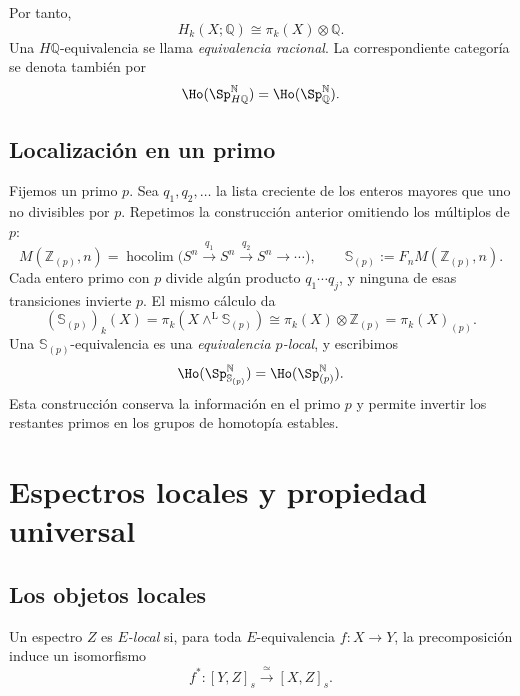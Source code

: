 Por tanto,
\[
H_k(X;\mathbb Q)\cong\pi_k(X)\otimes\mathbb Q.
\]
Una $H\mathbb Q$-equivalencia se llama \emph{equivalencia racional}. La correspondiente categoría se denota también por
\[
\Ho(\Sp_{H\mathbb Q}^{\mathbb N})=\Ho(\Sp_{\mathbb Q}^{\mathbb N}).
\]

\subsection{Localización en un primo}
Fijemos un primo $p$. Sea $q_1,q_2,\ldots$ la lista creciente de los enteros mayores que uno no divisibles por $p$. Repetimos la construcción anterior omitiendo los múltiplos de $p$:
\[
M(\mathbb Z_{(p)},n)=\operatorname*{hocolim}
\bigl(S^n\xrightarrow{q_1}S^n\xrightarrow{q_2}S^n\longrightarrow\cdots\bigr),
\qquad\mathbb S_{(p)}:=F_nM(\mathbb Z_{(p)},n).
\]
Cada entero primo con $p$ divide algún producto $q_1\cdots q_j$, y ninguna de esas transiciones invierte $p$. El mismo cálculo da
\[
(\mathbb S_{(p)})_k(X)
=\pi_k(X\wedge^{\mathrm L}\mathbb S_{(p)})
\cong\pi_k(X)\otimes\mathbb Z_{(p)}
=\pi_k(X)_{(p)}.
\]
Una $\mathbb S_{(p)}$-equivalencia es una \emph{equivalencia $p$-local}, y escribimos
\[
\Ho(\Sp_{\mathbb S_{(p)}}^{\mathbb N})=\Ho(\Sp_{(p)}^{\mathbb N}).
\]
Esta construcción conserva la información en el primo $p$ y permite invertir los restantes primos en los grupos de homotopía estables.

\section{Espectros locales y propiedad universal}

\subsection{Los objetos locales}
\begin{defi}\label{defi:c21-espectro-local}
Un espectro $Z$ es \emph{$E$-local} si, para toda $E$-equivalencia $f\colon X\to Y$, la precomposición induce un isomorfismo
\[
f^*\colon[Y,Z]_s\xrightarrow{\ \simeq\ }[X,Z]_s.
\]
\end{defi}

